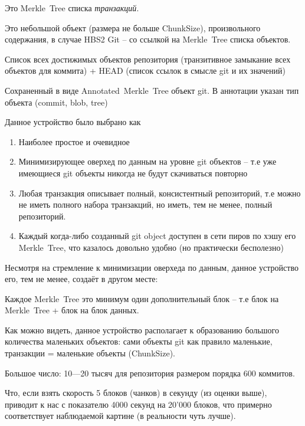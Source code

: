 \documentclass[11pt,a4paper]{article}
\begin{document}
\begin{description}[itemsep=10pt]
  \item[Reflog] Это Merkle~Tree списка \textit{транзакций}.
  \item[Транзакция] Это небольшой объект (размера не больше ChunkSize),
    произвольного содержания, в случае HBS2 Git -- со ссылкой на Merkle~Tree
    списка объектов.
  \item[Object list] Список всех достижимых объектов репозитория (транзитивное
    замыкание всех объектов для коммита) + HEAD (список ссылок в смысле git и их значений)
  \item[Git Object] Сохраненный в виде Annotated~Merkle~Tree объект git. В
    аннотации указан тип объекта (commit, blob, tree)
\end{description}

Данное устройство было выбрано как

\begin{enumerate}
  \item Наиболее простое и очевидное
  \item Минимизирующее оверхед по данным на уровне git объектов -- т.е уже
    имеющиеся git объекты никогда не будут скачиваться повторно
  \item Любая транзакция описывает полный, консистентный репозиторий, т.е можно
    не иметь полного набора транзакций, но иметь, тем не менее, полный
    репозиторий.
  \item Каждый когда-либо созданный git object доступен в сети пиров по хэшу его
    Merkle~Tree, что казалось довольно удобно (но практически бесполезно)
\end{enumerate}

Несмотря на стремление к минимизации оверхеда по данным, данное устройство его,
тем не менее, создаёт в другом месте:

Каждое Merkle~Tree это минимум один дополнительный блок -- т.е блок на
Merkle~Tree + блок на блок данных.

Как можно видеть, данное устройство располагает к образованию большого
количества маленьких объектов: сами объекты git как правило маленькие,
транзакции = маленькие объекты (ChunkSize).

Большое число: 10---20 тысяч для репозитория размером порядка 600 коммитов.

Что, если взять скорость 5 блоков (чанков) в секунду (из оценки выше), приводит
к нас с показателю 4000 секунд на 20'000 блоков, что примерно соответствует
наблюдаемой картине (в реальности чуть лучше).
\end{document}
